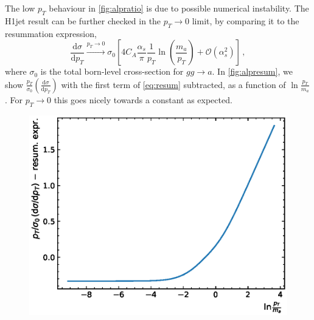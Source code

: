 \documentclass[12pt,a4wide]{article}
\begin{document}
The low $p_T$ behaviour in \autoref{fig:alpratio} is due to possible numerical instability. The H1jet result can be further checked in the $p_{T} \rightarrow 0$ limit, by comparing it to the resummation expression, 
\begin{equation}
	\frac{\mathrm{d} \sigma}{\mathrm{d} p_T} \xrightarrow{p_T \rightarrow 0} \sigma_0 \left [ 4 C_A \frac{\alpha_s}{\pi} \frac{1}{p_T} \ln\left ( \frac{m_a}{p_T} \right ) + \mathcal{O} ( \alpha_s^2 ) \right ] \,, \label{eq:resum}
\end{equation}
where $\sigma_0$ is the total born-level cross-section for $gg \rightarrow a$. In \autoref{fig:alpresum}, we show $\frac{p_T}{\sigma_0} \left ( \frac{\mathrm{d} \sigma}{\mathrm{d} p_T} \right )$ with the first term of \autoref{eq:resum} subtracted, as a function of $\ln \frac{p_T}{m_a}$. For $p_T \rightarrow 0$ this goes nicely towards a constant as expected. 

\begin{figure}[tbh] 
  \centering
  \includegraphics[width=0.6\linewidth]{figures/alpresum}
  \label{fig:alpresum}
\end{figure}
\end{document}
